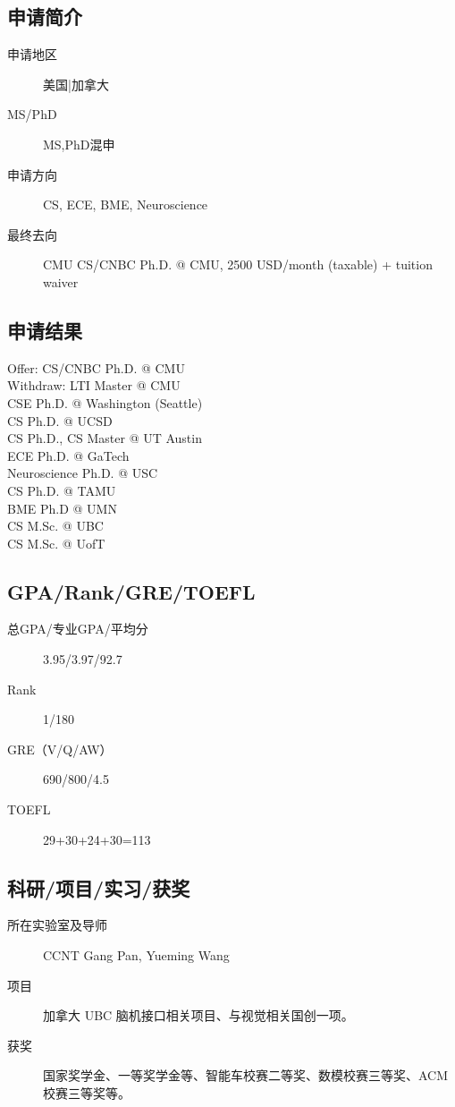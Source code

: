\documentclass[11pt,fleqn,openany]{book} %
\begin{document}
\noindent\begin{minipage}[t]{0.45\textwidth}
\subsection*{申请简介}
\begin{description}
\item[申请地区] 美国|加拿大
\item[MS/PhD] MS,PhD混申
\item[申请方向] CS, ECE, BME, Neuroscience
\item[最终去向] CMU CS/CNBC Ph.D. @ CMU, 2500 USD/month (taxable) + tuition waiver
\end{description}
\end{minipage}
\hfill
\begin{minipage}[t]{0.45\textwidth}
\subsection*{申请结果}
\noindent Offer: CS/CNBC Ph.D. @ CMU\\
Withdraw: LTI Master @ CMU\\
CSE Ph.D. @ Washington (Seattle)\\
CS Ph.D. @ UCSD\\
CS Ph.D., CS Master @ UT Austin\\
ECE Ph.D. @ GaTech\\
Neuroscience Ph.D. @ USC\\
CS Ph.D. @ TAMU\\
BME Ph.D @ UMN\\
CS M.Sc. @ UBC\\
CS M.Sc. @ UofT
\end{minipage}
\subsection*{GPA/Rank/GRE/TOEFL}
\begin{description}
\item[总GPA/专业GPA/平均分] 3.95/3.97/92.7
\item[Rank] 1/180
\item[GRE（V/Q/AW）] 690/800/4.5
\item[TOEFL] 29+30+24+30=113
\end{description}

\subsection*{科研/项目/实习/获奖}
\begin{description}
\item[所在实验室及导师] CCNT Gang Pan, Yueming Wang
\item[项目] 加拿大 UBC 脑机接口相关项目、与视觉相关国创一项。
\item[获奖] 国家奖学金、一等奖学金等、智能车校赛二等奖、数模校赛三等奖、ACM 校赛三等奖等。
\end{description}
\end{document}
